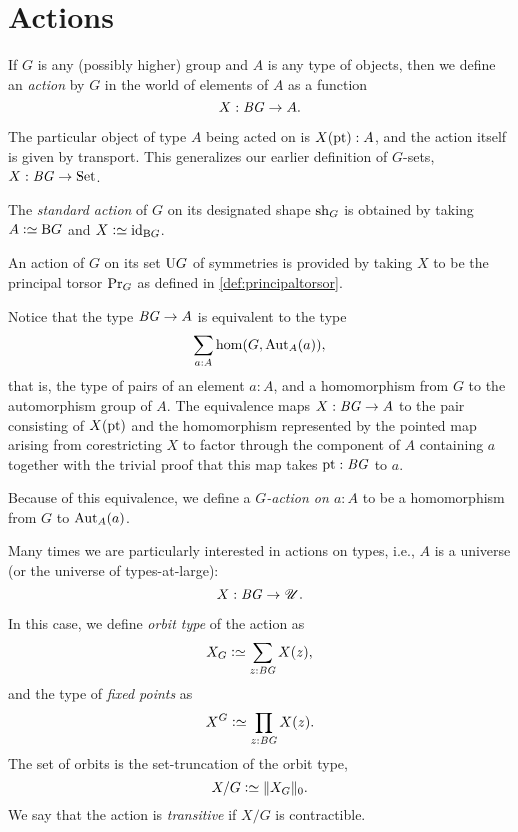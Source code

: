 \section{Actions}
\label{sec:actions}

\begin{definition}\label{action}
  If $G$ is any (possibly higher) group and $A$ is any type of objects,
  then we define an \emph{action} by $G$ in the world of elements of $A$ as a function
  \[
    X : \mathit{B}\mathit{G} \to A.
  \]
\end{definition}

The particular object of type $A$ being acted on is $X(\mathrm{pt}):A$,
and the action itself is given by transport.
This generalizes our earlier definition of $G$-sets, $X : \mathit{B}\mathit{G} \to \mathrm{Set}$.

\begin{definition}\label{std-action}
  The \emph{standard action} of $G$ on its designated shape $\mathrm{sh}_G$ is obtained by
  taking $A \defeq \B G$ and $X \defeq \id_{\B G}$.
\end{definition}

\begin{example}
  An action of $G$ on its set $\mathrm{U} G$ of symmetries is provided by taking $X$ to be the principal torsor $\mathrm{Pr}_{{G}}$ as defined in
  \cref{def:principaltorsor}.
\end{example}

Notice that the type $\mathit{B}\mathit{G} \to A$ is equivalent to the type
\[
  \sum_{a:A}\hom(G,\Aut_A(a)),
\]
that is, the type of pairs of an element $a : A$,
and a homomorphism from $G$ to the automorphism group of $A$.
The equivalence maps $X:\mathit{B}\mathit{G}\to A$ to the pair consisting of $X(\mathrm{pt})$
and the homomorphism represented by the pointed map arising
from corestricting $X$ to factor through the component of $A$ containing $a$
together with the trivial proof that this map takes $\mathrm{pt}:\mathit{B}\mathit{G}$ to $a$.

Because of this equivalence,
we define a \emph{$G$-action on $a:A$}
to be a homomorphism from $G$ to $\Aut_A(a)$.

Many times we are particularly interested in actions on types,
i.e., $A$ is a universe (or the universe of types-at-large):
\[
  X : \mathit{B}\mathit{G} \to {\mathscr{U}}.
\]

In this case, we define \emph{orbit type} of the action as
\[
  X_G \defeq \sum_{z:\BG} X(z),
\]
and the type of \emph{fixed points} as
\[
  X^G \defeq \prod_{z:\BG} X(z).
\]
The set of orbits is the set-truncation of the orbit type,
\[
  X / G \defeq \Trunc{X_G}_0.
\]
We say that the action is \emph{transitive} if $X / G$ is contractible.

